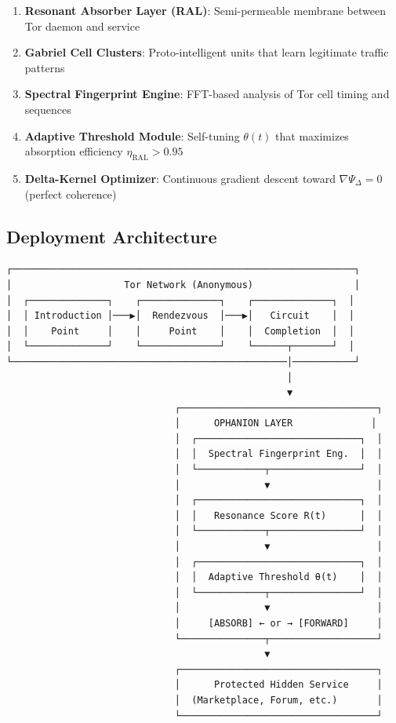 \documentclass[11pt,a4paper]{article}
\begin{document}
\begin{enumerate}
\item \textbf{Resonant Absorber Layer (RAL)}: Semi-permeable membrane between Tor daemon and service
\item \textbf{Gabriel Cell Clusters}: Proto-intelligent units that learn legitimate traffic patterns
\item \textbf{Spectral Fingerprint Engine}: FFT-based analysis of Tor cell timing and sequences
\item \textbf{Adaptive Threshold Module}: Self-tuning $\theta(t)$ that maximizes absorption efficiency $\eta_{\text{RAL}} > 0.95$
\item \textbf{Delta-Kernel Optimizer}: Continuous gradient descent toward $\nabla\Psi_\Delta = 0$ (perfect coherence)
\end{enumerate}

\subsection{Deployment Architecture}

\begin{verbatim}
┌─────────────────────────────────────────────────────────────┐
│                    Tor Network (Anonymous)                  │
│  ┌──────────────┐    ┌──────────────┐    ┌──────────────┐  │
│  │ Introduction │───▶│  Rendezvous  │───▶│   Circuit    │  │
│  │    Point     │    │     Point    │    │  Completion  │  │
│  └──────────────┘    └──────────────┘    └──────┬───────┘  │
└─────────────────────────────────────────────────│───────────┘
                                                  │
                                                  ▼
                              ┌───────────────────────────────────┐
                              │      OPHANION LAYER              │
                              │  ┌─────────────────────────────┐  │
                              │  │  Spectral Fingerprint Eng.  │  │
                              │  └────────────┬────────────────┘  │
                              │               ▼                   │
                              │  ┌─────────────────────────────┐  │
                              │  │   Resonance Score R(t)      │  │
                              │  └────────────┬────────────────┘  │
                              │               ▼                   │
                              │  ┌─────────────────────────────┐  │
                              │  │  Adaptive Threshold θ(t)    │  │
                              │  └────────────┬────────────────┘  │
                              │               ▼                   │
                              │     [ABSORB] ← or → [FORWARD]     │
                              └───────────────┬───────────────────┘
                                              ▼
                              ┌───────────────────────────────────┐
                              │      Protected Hidden Service     │
                              │  (Marketplace, Forum, etc.)       │
                              └───────────────────────────────────┘
\end{verbatim}
\end{document}
